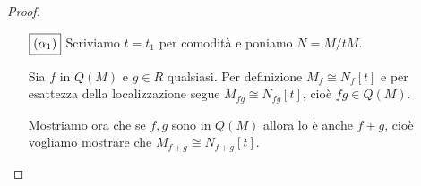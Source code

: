 \begin{proof}
\begin{itemize}
Grazie a questo risultato abbiamo il seguente diagramma commutativo
\[\begin{tikzcd}
	{M_\mf} && {M_\mf'[t_n]} \\
	\\
	{N_\mf[t_1,\cdots,t_n]} && {N_\mf[t_1,\cdots,t_{n-1}][t_n]}
	\arrow[from=1-1, to=1-3]
	\arrow["\sim", from=1-1, to=3-1]
	\arrow["\sim", from=1-3, to=3-3]
	\arrow["\sim", from=3-1, to=3-3]
\end{tikzcd}\]
dove la prima freccia verticale \`e un isomorfismo per ipotesi, la seconda \`e un isomorfismo per quanto appena detto e l'orizzontale in fondo \`e l'identit\`a. Segue che $M\cong M'[t_n]$.

Osserviamo che è possibile applicare $(\beta_1)$ ad $A'[t_n]$ e a $M$ in quanto $M_\mf/t_n M_\mf=M'_\mf$ e 
\[M_\mf\cong N_\mf[t_1,\cdots, t_n]\cong N_\mf[t_1,\cdots,t_{n-1}][t_n]\cong M_\mf'[t_n]\]
per quanto detto. Quindi $M$ \`e esteso da $A'$, cio\`e 
\[M\cong M/t_n M[t_n]=M'[t_n]=N[t_1,\cdots,t_{n-1}][t_n]\]
come voluto.
\item[$\boxed{(\alpha_1)}$] Scriviamo $t=t_1$ per comodit\`a e poniamo $N=M/tM$. 

Sia $f$ in $Q(M)$ e $g\in R$ qualsiasi. Per definizione $M_f\cong N_f[t]$ e per esattezza della localizzazione segue $M_{fg}\cong N_{fg}[t]$, cio\`e $fg\in Q(M)$. 


Mostriamo ora che se $f,g$ sono in $Q(M)$ allora lo è anche $f+g$, cio\`e vogliamo mostrare che $M_{f+g}\cong N_{f+g}[t]$. 



\end{itemize}
\end{proof}
